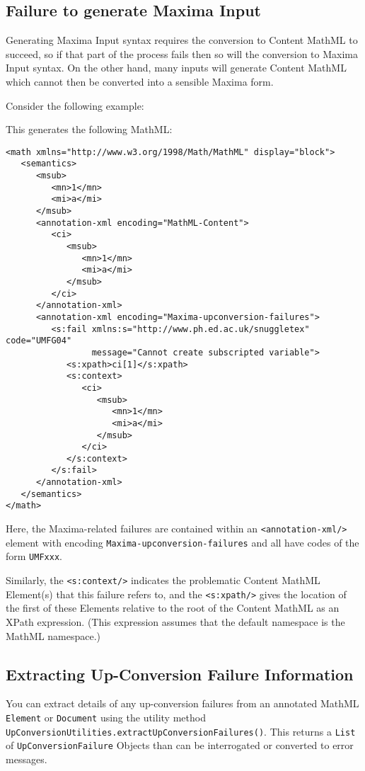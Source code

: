 \subsection*{Failure to generate Maxima Input}

Generating Maxima Input syntax requires the conversion to Content MathML to
succeed, so if that part of the process fails then so will the conversion to
Maxima Input syntax. On the other hand, many inputs will generate Content MathML
which cannot then be converted into a sensible Maxima form.

Consider the following example:


This generates the following MathML:

\begin{verbatim}
<math xmlns="http://www.w3.org/1998/Math/MathML" display="block">
   <semantics>
      <msub>
         <mn>1</mn>
         <mi>a</mi>
      </msub>
      <annotation-xml encoding="MathML-Content">
         <ci>
            <msub>
               <mn>1</mn>
               <mi>a</mi>
            </msub>
         </ci>
      </annotation-xml>
      <annotation-xml encoding="Maxima-upconversion-failures">
         <s:fail xmlns:s="http://www.ph.ed.ac.uk/snuggletex" code="UMFG04"
                 message="Cannot create subscripted variable">
            <s:xpath>ci[1]</s:xpath>
            <s:context>
               <ci>
                  <msub>
                     <mn>1</mn>
                     <mi>a</mi>
                  </msub>
               </ci>
            </s:context>
         </s:fail>
      </annotation-xml>
   </semantics>
</math>
\end{verbatim}

Here, the Maxima-related failures are contained within an
\verb|<annotation-xml/>| element with encoding \verb|Maxima-upconversion-failures|
and all have codes of the form \verb|UMFxxx|.

Similarly, the \verb|<s:context/>| indicates the problematic Content MathML Element(s)
that this failure refers to, and the \verb|<s:xpath/>| gives the location of
the first of these Elements relative to the root of the Content MathML as
an XPath expression. (This expression assumes that the default namespace is the
MathML namespace.)


\subsection*{Extracting Up-Conversion Failure Information}

You can extract details of any up-conversion failures from an annotated MathML
\verb|Element| or \verb|Document| using the utility method
\verb|UpConversionUtilities.extractUpConversionFailures()|. This returns
a \verb|List| of \verb|UpConversionFailure| Objects than can be interrogated or
converted to error messages.
